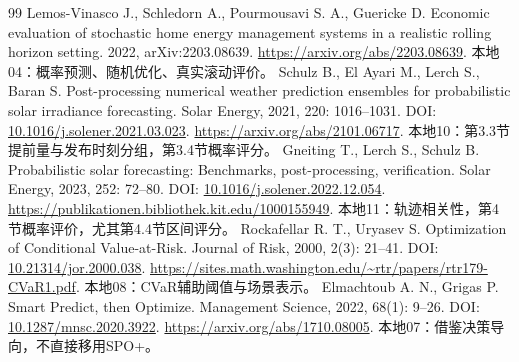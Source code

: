 \documentclass[UTF8,11pt]{ctexart}
\begin{document}
\begin{thebibliography}{99}
Lemos-Vinasco J., Schledorn A., Pourmousavi S. A., Guericke D.
Economic evaluation of stochastic home energy management systems in a realistic rolling horizon setting.
2022, arXiv:2203.08639. \url{https://arxiv.org/abs/2203.08639}.
本地04：概率预测、随机优化、真实滚动评价。
Schulz B., El Ayari M., Lerch S., Baran S.
Post-processing numerical weather prediction ensembles for probabilistic solar irradiance forecasting.
Solar Energy, 2021, 220: 1016--1031.
DOI: \href{https://doi.org/10.1016/j.solener.2021.03.023}{10.1016/j.solener.2021.03.023}.
\url{https://arxiv.org/abs/2101.06717}.
本地10：第3.3节提前量与发布时刻分组，第3.4节概率评分。
Gneiting T., Lerch S., Schulz B.
Probabilistic solar forecasting: Benchmarks, post-processing, verification.
Solar Energy, 2023, 252: 72--80.
DOI: \href{https://doi.org/10.1016/j.solener.2022.12.054}{10.1016/j.solener.2022.12.054}.
\url{https://publikationen.bibliothek.kit.edu/1000155949}.
本地11：轨迹相关性，第4节概率评价，尤其第4.4节区间评分。
Rockafellar R. T., Uryasev S.
Optimization of Conditional Value-at-Risk.
Journal of Risk, 2000, 2(3): 21--41.
DOI: \href{https://doi.org/10.21314/jor.2000.038}{10.21314/jor.2000.038}.
\url{https://sites.math.washington.edu/~rtr/papers/rtr179-CVaR1.pdf}.
本地08：CVaR辅助阈值与场景表示。
Elmachtoub A. N., Grigas P.
Smart Predict, then Optimize.
Management Science, 2022, 68(1): 9--26.
DOI: \href{https://doi.org/10.1287/mnsc.2020.3922}{10.1287/mnsc.2020.3922}.
\url{https://arxiv.org/abs/1710.08005}.
本地07：借鉴决策导向，不直接移用SPO+。
\end{thebibliography}
\end{document}
